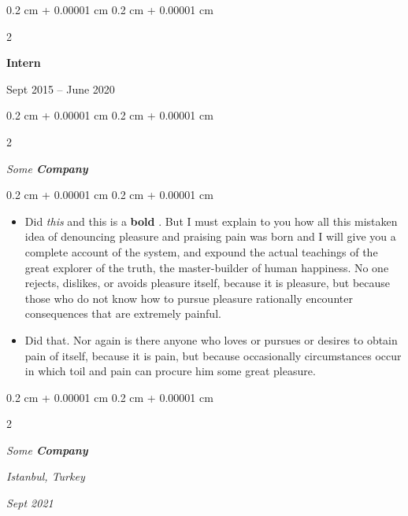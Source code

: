 \documentclass[10pt, letterpaper]{article}
\newenvironment{highlights}{
    \begin{itemize}[
        topsep=0.10 cm,
        parsep=0.10 cm,
        partopsep=0pt,
        itemsep=0pt,
        leftmargin=0.4 cm + 10pt
    ]
}{
    \end{itemize}
} %
\newenvironment{onecolentry}{
    \begin{adjustwidth}{
        0.2 cm + 0.00001 cm
    }{
        0.2 cm + 0.00001 cm
    }
}{
    \end{adjustwidth}
} %
\newenvironment{twocolentry}[2][]{
    \onecolentry
    \def\secondColumn{#2}
    \setcolumnwidth{\fill, 4.5 cm}
    \begin{paracol}{2}
}{
    \switchcolumn \raggedleft \secondColumn
    \end{paracol}
    \endonecolentry
} %
\let\hrefWithoutArrow\href
\renewcommand{\href}[2]{\hrefWithoutArrow{#1}{\ifthenelse{\equal{#2}{}}{ }{#2 }\raisebox{.15ex}{\footnotesize \faExternalLink*}}}
\begin{document}
        \vspace{0.2 cm}

                \begin{twocolentry}{
                    Sept 2015 – June 2020
                }
                \textbf{Intern}
                \end{twocolentry}
            \begin{twocolentry}{
            }
            \textit{Some \textbf{Company}}
            \end{twocolentry}

        \vspace{0.10 cm}
        \begin{onecolentry}
            \begin{highlights}
                \item Did \textit{this} and this is a \textbf{bold} \href{https://example.com}{link}. But I must explain to you how all this mistaken idea of denouncing pleasure and praising pain was born and I will give you a complete account of the system, and expound the actual teachings of the great explorer of the truth, the master-builder of human happiness. No one rejects, dislikes, or avoids pleasure itself, because it is pleasure, but because those who do not know how to pursue pleasure rationally encounter consequences that are extremely painful.
                \item Did that. Nor again is there anyone who loves or pursues or desires to obtain pain of itself, because it is pain, but because occasionally circumstances occur in which toil and pain can procure him some great pleasure.
            \end{highlights}
        \end{onecolentry}


        \vspace{0.2 cm}

            \begin{twocolentry}{
        \textit{Istanbul, Turkey}

        \textit{Sept 2021}    }
                \textbf{}

                \textit{Some \textbf{Company}}
            \end{twocolentry}
\end{document}
